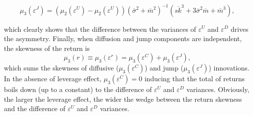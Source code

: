 \documentclass[11pt]{article}
\begin{document}
\begin{small}
\begin{equation}
\mu_{3}(\varepsilon^{J}) = \left( \mu_{2}(\varepsilon^{U})-\mu_{2}(\varepsilon^{U}) \right)\left( \overline {\sigma}^{2} + \overline {m}^{2} \right)^{-1}\left( \overline{sk}^{3}+ 3\overline {\sigma}^{2}\overline {m} + \overline {m}^{3} \right), \label{CGFSasDiffVaud}
\end{equation}

which clearly shows that the difference between the variances of $\varepsilon^{U}$ and $\varepsilon^{D}$ drives the asymmetry.
Finally, when diffusion and jump components are independent, the skewness of the return is
\begin{equation}
\mu_{3}(r) \equiv \mu_{3}(\varepsilon^{r}) =  \mu_{3}(\varepsilon^{C}) + \mu_{3}(\varepsilon^{J}), \label{CGFSretDecompose}
\end{equation}
which sums the skewness of diffusive ($\mu_{3}(\varepsilon^{C})$) and jump ($\mu_{3}(\varepsilon^{J})$) innovations. In the absence of leverage effect, $\mu_{3}(\varepsilon^{C})=0$ inducing that the total of returns boils down (up to a constant) to the difference of $\varepsilon^{U}$ and $\varepsilon^{D}$ variances.
Obviously, the larger the leverage effect, the wider the wedge between the return skewness and the difference of $\varepsilon^{U}$ and $\varepsilon^{D}$ variances.

\end{small}

\clearpage
\newpage
\end{document}
